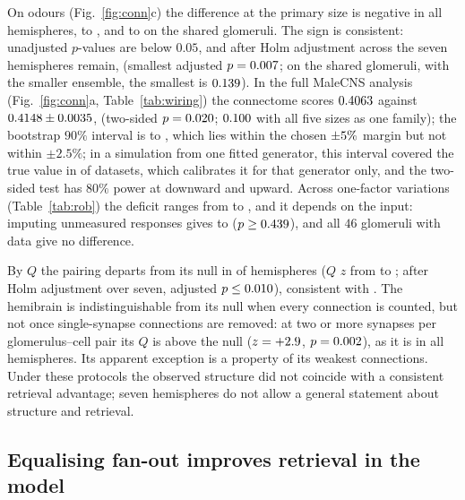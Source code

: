 \documentclass[conference]{IEEEtran}
\begin{document}
On odours (Fig.~\ref{fig:conn}c) the difference at the primary size is
negative in all \AnimN{} hemispheres, \AnimOdourMin{} to \AnimOdourMax{}, and
\AnimMatchedMin{} to \AnimMatchedMax{} on the shared glomeruli. The sign is
consistent: \AnimOdourNSig{} unadjusted $p$-values are below $0.05$, and after Holm
adjustment across the seven hemispheres \AnimOdourHolmN{} remain, \AnimOdourHolmNames{}
(smallest adjusted $p=0.007$; on the shared glomeruli, with the
smaller ensemble, the smallest is $0.139$). In the full MaleCNS analysis (Fig.~\ref{fig:conn}a, Table~\ref{tab:wiring}) the connectome scores $0.4063$ against
$0.4148\pm0.0035$, \PrimaryRel{} (two-sided
$p=0.020$; $0.100$ with all five sizes as one family); the
bootstrap $90\%$ interval is \BootLo{} to \BootHi{}, which lies within the
chosen $\pm5\%$ margin but not within $\pm2.5\%$; in a simulation
from one fitted generator, this interval covered the true value in \CovNew{}
of \CovDatasets{} datasets, which calibrates it for that generator only, and the two-sided test has $80\%$ power at
\MdeDown{} downward and \MdeUp{} upward. Across \RobN{} one-factor variations (Table~\ref{tab:rob}) the deficit ranges from
\RobRelMin{} to \RobRelMax{}, and it depends on the input: imputing unmeasured responses gives \ImputeRelMin{} to
\ImputeRelMax{} ($p\ge0.439$), and all $46$ glomeruli with data give no
difference.



By $Q$ the pairing departs from its null in \AnimQNSig{} of \AnimN{} hemispheres
($Q$ $z$ from \AnimQzMin{} to \AnimQzMax{}; \AnimQNSigHolm{} after Holm adjustment
over seven, adjusted $p\le0.010$), consistent with \cite{zheng2022}.
The hemibrain is indistinguishable from its null when every connection is
counted, but not once single-synapse connections are removed: at two or more
synapses per glomerulus--cell pair its $Q$ is above the null
($z=+2.9$, $p=0.002$), as it is in all \QDepartTwo{} hemispheres. Its
apparent exception is a property of its weakest connections. Under these protocols the observed structure did not coincide with
a consistent retrieval advantage; seven hemispheres do not allow a general
statement about structure and retrieval.

\subsection{Equalising fan-out improves retrieval in the model}
\end{document}
